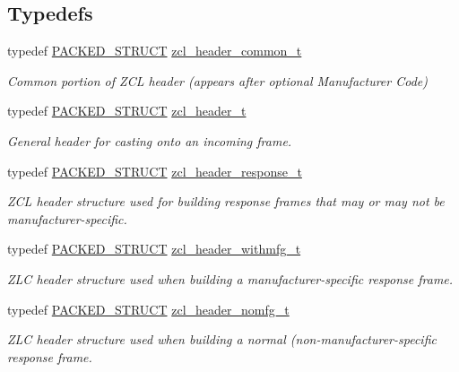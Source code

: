 \subsection*{Typedefs}
\begin{DoxyCompactItemize}
\item 
typedef \hyperlink{group___s_x_a_ga4233297bd31be5c273d4fb0758cc54d7}{P\-A\-C\-K\-E\-D\-\_\-\-S\-T\-R\-U\-C\-T} \hyperlink{group__zcl_gaece1b64b04ac629f83358d6d815451a5}{zcl\-\_\-header\-\_\-common\-\_\-t}
\begin{DoxyCompactList}\small\item\em Common portion of Z\-C\-L header (appears after optional Manufacturer Code) \end{DoxyCompactList}\item 
typedef \hyperlink{group___s_x_a_ga4233297bd31be5c273d4fb0758cc54d7}{P\-A\-C\-K\-E\-D\-\_\-\-S\-T\-R\-U\-C\-T} \hyperlink{group__zcl_gafc361d46dded7f1761048d78e3d4e18d}{zcl\-\_\-header\-\_\-t}
\begin{DoxyCompactList}\small\item\em General header for casting onto an incoming frame. \end{DoxyCompactList}\item 
typedef \hyperlink{group___s_x_a_ga4233297bd31be5c273d4fb0758cc54d7}{P\-A\-C\-K\-E\-D\-\_\-\-S\-T\-R\-U\-C\-T} \hyperlink{group__zcl_gaeac1f6671916dd0ad92b271080ec272a}{zcl\-\_\-header\-\_\-response\-\_\-t}
\begin{DoxyCompactList}\small\item\em Z\-C\-L header structure used for building response frames that may or may not be manufacturer-\/specific. \end{DoxyCompactList}\item 
typedef \hyperlink{group___s_x_a_ga4233297bd31be5c273d4fb0758cc54d7}{P\-A\-C\-K\-E\-D\-\_\-\-S\-T\-R\-U\-C\-T} \hyperlink{group__zcl_gac376225f8ee77006b884a222a9ac25cc}{zcl\-\_\-header\-\_\-withmfg\-\_\-t}
\begin{DoxyCompactList}\small\item\em Z\-L\-C header structure used when building a manufacturer-\/specific response frame. \end{DoxyCompactList}\item 
typedef \hyperlink{group___s_x_a_ga4233297bd31be5c273d4fb0758cc54d7}{P\-A\-C\-K\-E\-D\-\_\-\-S\-T\-R\-U\-C\-T} \hyperlink{group__zcl_gae988eb59c8a2e75b6cb34aefeca315d1}{zcl\-\_\-header\-\_\-nomfg\-\_\-t}
\begin{DoxyCompactList}\small\item\em Z\-L\-C header structure used when building a normal (non-\/manufacturer-\/specific response frame. \end{DoxyCompactList}\item 

\end{DoxyCompactItemize}
